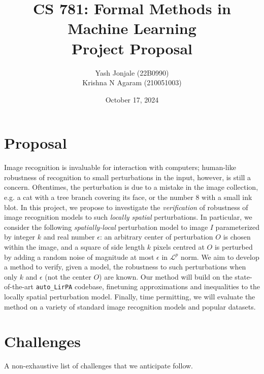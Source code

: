 \documentclass{article}
\title{CS 781: Formal Methods in Machine Learning\\Project Proposal}
\author{Yash Jonjale (22B0990)\\Krishna N Agaram (210051003)}
\date{October 17, 2024}
\begin{document}
\maketitle
\tableofcontents
\section{Proposal}\label{sec:proposal}

Image recognition is invaluable for interaction with computers; human-like robustness of recognition to small perturbations in the input, however, is still a concern. Oftentimes, the perturbation is due to a mistake in the image collection, e.g. a cat with a tree branch covering its face, or the number 8 with a small ink blot. In this project, we propose to investigate the \emph{verification} of robustness of image recognition models to such \emph{locally spatial} perturbations. In particular, we consider the following \emph{spatially-local} perturbation model to image $I$ parameterized by integer $k$ and real number $\epsilon$: an arbitrary center of perturbation $O$ is chosen within the image, and a square of side length $k$ pixels centred at $O$ is perturbed by adding a random noise of magnitude at most $\epsilon$ in $\mathcal L^p$ norm. We aim to develop a method to verify, given a model, the robustness to such perturbations when only $k$ and $\epsilon$ (not the center $O$) are known. Our method will build on the state-of-the-art \texttt{auto\_LirPA} codebase, finetuning approximations and inequalities to the locally spatial perturbation model. Finally, time permitting, we will evaluate the method on a variety of standard image recognition models and popular datasets.

\section{Challenges}\label{sec:challenges}

A non-exhaustive list of challenges that we anticipate follow.
\end{document}
